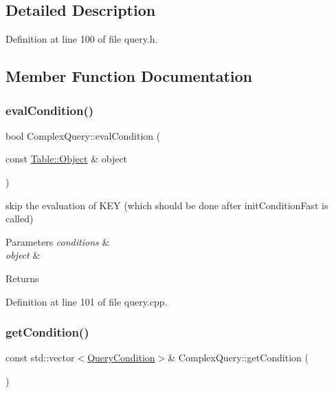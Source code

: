 \subsection{Detailed Description}


Definition at line 100 of file query.\+h.



\subsection{Member Function Documentation}
\mbox{\label{class_complex_query_ae6d00834afbcbe7322b5d7c2fee11e1e}} 
\subsubsection{\texorpdfstring{eval\+Condition()}{evalCondition()}}
{\footnotesize\ttfamily bool Complex\+Query\+::eval\+Condition (\begin{DoxyParamCaption}\item[{const \hyperlink{class_table_1_1_object_impl}{Table\+::\+Object} \&}]{object }\end{DoxyParamCaption})}

skip the evaluation of K\+EY (which should be done after init\+Condition\+Fast is called) 
\begin{DoxyParams}{Parameters}
{\em conditions} & \\
\hline
{\em object} & \\
\hline
\end{DoxyParams}
\begin{DoxyReturn}{Returns}

\end{DoxyReturn}


Definition at line 101 of file query.\+cpp.

\mbox{\label{class_complex_query_a675cc1fc7bbecf1c92698171131fd3c1}} 
\subsubsection{\texorpdfstring{get\+Condition()}{getCondition()}}
{\footnotesize\ttfamily const std\+::vector$<$\hyperlink{struct_query_condition}{Query\+Condition}$>$\& Complex\+Query\+::get\+Condition (\begin{DoxyParamCaption}{ }\end{DoxyParamCaption})\hspace{0.3cm}{\ttfamily [inline]}}

